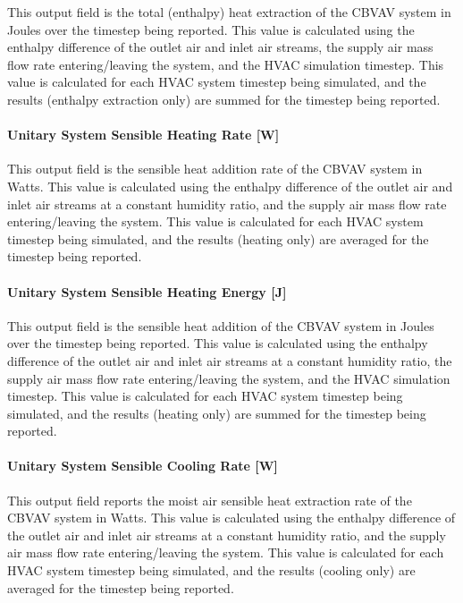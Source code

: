 This output field is the total (enthalpy) heat extraction of the CBVAV system in Joules over the timestep being reported. This value is calculated using the enthalpy difference of the outlet air and inlet air streams, the supply air mass flow rate entering/leaving the system, and the HVAC simulation timestep. This value is calculated for each HVAC system timestep being simulated, and the results (enthalpy extraction only) are summed for the timestep being reported.

\paragraph{Unitary System Sensible Heating Rate {[}W{]}}\label{unitary-system-sensible-heating-rate-w-2}

This output field is the sensible heat addition rate of the CBVAV system in Watts. This value is calculated using the enthalpy difference of the outlet air and inlet air streams at a constant humidity ratio, and the supply air mass flow rate entering/leaving the system. This value is calculated for each HVAC system timestep being simulated, and the results (heating only) are averaged for the timestep being reported.

\paragraph{Unitary System Sensible Heating Energy {[}J{]}}\label{unitary-system-sensible-heating-energy-j}

This output field is the sensible heat addition of the CBVAV system in Joules over the timestep being reported. This value is calculated using the enthalpy difference of the outlet air and inlet air streams at a constant humidity ratio, the supply air mass flow rate entering/leaving the system, and the HVAC simulation timestep. This value is calculated for each HVAC system timestep being simulated, and the results (heating only) are summed for the timestep being reported.

\paragraph{Unitary System Sensible Cooling Rate {[}W{]}}\label{unitary-system-sensible-cooling-rate-w-2}

This output field reports the moist air sensible heat extraction rate of the CBVAV system in Watts. This value is calculated using the enthalpy difference of the outlet air and inlet air streams at a constant humidity ratio, and the supply air mass flow rate entering/leaving the system. This value is calculated for each HVAC system timestep being simulated, and the results (cooling only) are averaged for the timestep being reported.

